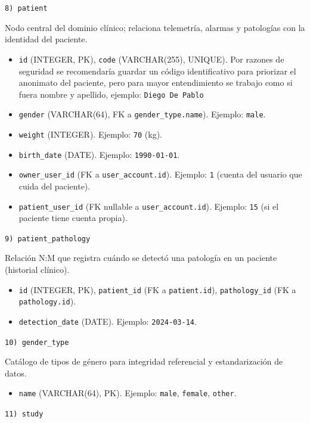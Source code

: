 \documentclass[12pt, a4paper]{article}
\begin{document}
\texttt{8) patient}


Nodo central del dominio clínico; relaciona telemetría, alarmas y patologías con la identidad del paciente.
\begin{itemize}
	\item \texttt{id} (INTEGER, PK), \texttt{code} (VARCHAR(255), UNIQUE). Por razones de seguridad se recomendaría guardar un código identificativo para priorizar el anonimato del paciente, pero para mayor entendimiento se trabajo como si fuera nombre y apellido, ejemplo: \texttt{Diego De Pablo}
	\item \texttt{gender} (VARCHAR(64), FK a \texttt{gender\_type.name}). Ejemplo: \texttt{male}.
	\item \texttt{weight} (INTEGER). Ejemplo: \texttt{70} (kg).
	\item \texttt{birth\_date} (DATE). Ejemplo: \texttt{1990-01-01}.
	\item \texttt{owner\_user\_id} (FK a \texttt{user\_account.id}). Ejemplo: \texttt{1} (cuenta del usuario que cuida del paciente).
	\item \texttt{patient\_user\_id} (FK nullable a \texttt{user\_account.id}). Ejemplo: \texttt{15} (si el paciente tiene cuenta propia).
\end{itemize}



\texttt{9) patient\_pathology}

Relación N:M que registra cuándo se detectó una patología en un paciente (historial clínico).
\begin{itemize}
	\item \texttt{id} (INTEGER, PK), \texttt{patient\_id} (FK a \texttt{patient.id}), \texttt{pathology\_id} (FK a \texttt{pathology.id}).
	\item \texttt{detection\_date} (DATE). Ejemplo: \texttt{2024-03-14}.
\end{itemize}


\texttt{10) gender\_type}

Catálogo de tipos de género para integridad referencial y estandarización de datos.
\begin{itemize}
	\item \texttt{name} (VARCHAR(64), PK). Ejemplo: \texttt{male}, \texttt{female}, \texttt{other}.
\end{itemize}


\texttt{11) study}
\end{document}
